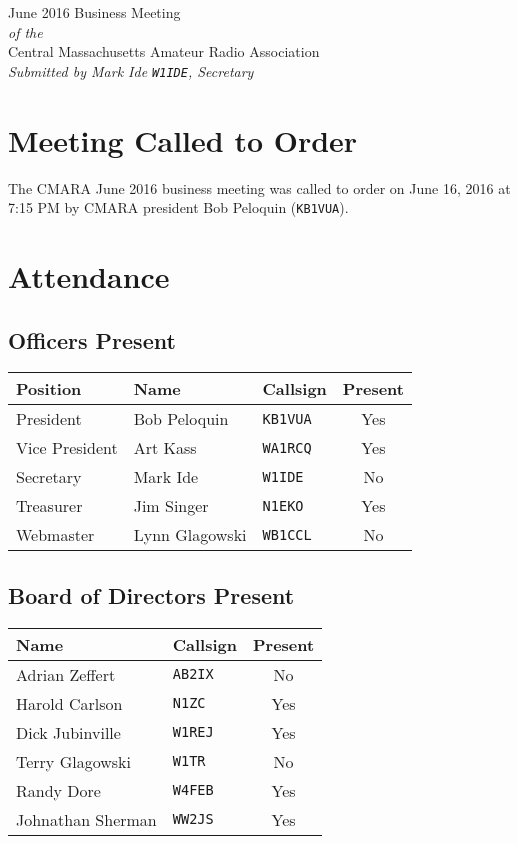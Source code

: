 \documentclass[10pt,letterpaper]{article}
\begin{document}
\begin{center}
{\huge June 2016 Business Meeting}\\
\emph{of the}\\
{\Large Central Massachusetts Amateur Radio Association}\\
\emph{Submitted by Mark Ide \texttt{W1IDE}, Secretary}
\end{center}

\section{Meeting Called to Order}
The CMARA June 2016 business meeting was called to order on June 16, 2016 at 7:15 PM by CMARA president Bob Peloquin (\texttt{KB1VUA}).

\section{Attendance}

\subsection{Officers Present}

\begin{tabular}{|l|l|l|c|}
  \hline
  \textbf{Position} & \textbf{Name}  & \textbf{Callsign} & \textbf{Present} \\ \hline
  President         & Bob Peloquin   & \texttt{KB1VUA}   & Yes \\
  Vice President    & Art Kass       & \texttt{WA1RCQ}   & Yes \\
  Secretary         & Mark Ide       & \texttt{W1IDE}    & No \\
  Treasurer         & Jim Singer     & \texttt{N1EKO}    & Yes \\
  Webmaster         & Lynn Glagowski & \texttt{WB1CCL}   & No \\
  \hline
\end{tabular}

\subsection{Board of Directors Present}

\begin{tabular}{|l|l|c|}
  \hline
  \textbf{Name}     & \textbf{Callsign} & \textbf{Present} \\ \hline
  Adrian Zeffert    & \texttt{AB2IX}    & No  \\
  Harold Carlson    & \texttt{N1ZC}     & Yes \\
  Dick Jubinville   & \texttt{W1REJ}    & Yes \\
  Terry Glagowski   & \texttt{W1TR}     & No \\
  Randy Dore        & \texttt{W4FEB}    & Yes \\
  Johnathan Sherman & \texttt{WW2JS}    & Yes \\
  \hline
\end{tabular}
\end{document}
